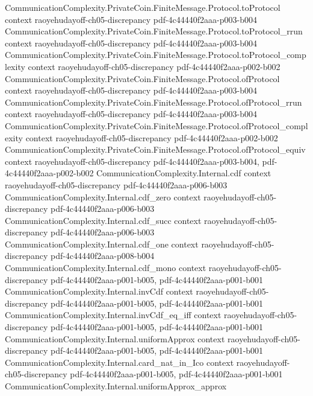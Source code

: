 \begin{lemma}
  {CommunicationComplexity.PrivateCoin.FiniteMessage.Protocol.toProtocol}
  {context}
  {raoyehudayoff-ch05-discrepancy}
  {pdf-4c44440f2aaa-p003-b004}
\proofstep
  {CommunicationComplexity.PrivateCoin.FiniteMessage.Protocol.toProtocol_rrun}
  {context}
  {raoyehudayoff-ch05-discrepancy}
  {pdf-4c44440f2aaa-p003-b004}
\proofstep
  {CommunicationComplexity.PrivateCoin.FiniteMessage.Protocol.toProtocol_complexity}
  {context}
  {raoyehudayoff-ch05-discrepancy}
  {pdf-4c44440f2aaa-p002-b002}
\proofstep
  {CommunicationComplexity.PrivateCoin.FiniteMessage.Protocol.ofProtocol}
  {context}
  {raoyehudayoff-ch05-discrepancy}
  {pdf-4c44440f2aaa-p003-b004}
\proofstep
  {CommunicationComplexity.PrivateCoin.FiniteMessage.Protocol.ofProtocol_rrun}
  {context}
  {raoyehudayoff-ch05-discrepancy}
  {pdf-4c44440f2aaa-p003-b004}
\proofstep
  {CommunicationComplexity.PrivateCoin.FiniteMessage.Protocol.ofProtocol_complexity}
  {context}
  {raoyehudayoff-ch05-discrepancy}
  {pdf-4c44440f2aaa-p002-b002}
\proofstep
  {CommunicationComplexity.PrivateCoin.FiniteMessage.Protocol.ofProtocol_equiv}
  {context}
  {raoyehudayoff-ch05-discrepancy}
  {pdf-4c44440f2aaa-p003-b004,
    pdf-4c44440f2aaa-p002-b002}
\proofstep
  {CommunicationComplexity.Internal.cdf}
  {context}
  {raoyehudayoff-ch05-discrepancy}
  {pdf-4c44440f2aaa-p006-b003}
\proofstep
  {CommunicationComplexity.Internal.cdf_zero}
  {context}
  {raoyehudayoff-ch05-discrepancy}
  {pdf-4c44440f2aaa-p006-b003}
\proofstep
  {CommunicationComplexity.Internal.cdf_succ}
  {context}
  {raoyehudayoff-ch05-discrepancy}
  {pdf-4c44440f2aaa-p006-b003}
\proofstep
  {CommunicationComplexity.Internal.cdf_one}
  {context}
  {raoyehudayoff-ch05-discrepancy}
  {pdf-4c44440f2aaa-p008-b004}
\proofstep
  {CommunicationComplexity.Internal.cdf_mono}
  {context}
  {raoyehudayoff-ch05-discrepancy}
  {pdf-4c44440f2aaa-p001-b005,
    pdf-4c44440f2aaa-p001-b001}
\proofstep
  {CommunicationComplexity.Internal.invCdf}
  {context}
  {raoyehudayoff-ch05-discrepancy}
  {pdf-4c44440f2aaa-p001-b005,
    pdf-4c44440f2aaa-p001-b001}
\proofstep
  {CommunicationComplexity.Internal.invCdf_eq_iff}
  {context}
  {raoyehudayoff-ch05-discrepancy}
  {pdf-4c44440f2aaa-p001-b005,
    pdf-4c44440f2aaa-p001-b001}
\proofstep
  {CommunicationComplexity.Internal.uniformApprox}
  {context}
  {raoyehudayoff-ch05-discrepancy}
  {pdf-4c44440f2aaa-p001-b005,
    pdf-4c44440f2aaa-p001-b001}
\proofstep
  {CommunicationComplexity.Internal.card_nat_in_Ico}
  {context}
  {raoyehudayoff-ch05-discrepancy}
  {pdf-4c44440f2aaa-p001-b005,
    pdf-4c44440f2aaa-p001-b001}
\proofstep
  {CommunicationComplexity.Internal.uniformApprox_approx}

\end{lemma}
